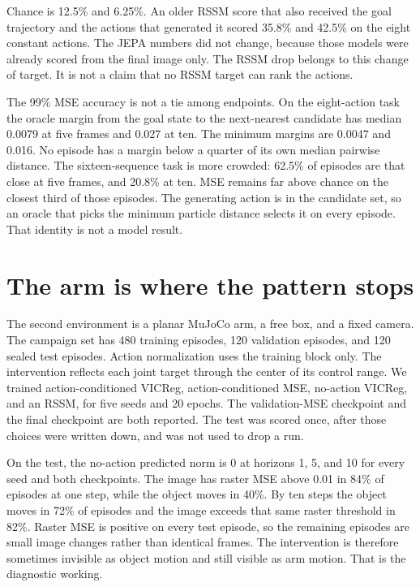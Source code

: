 \documentclass{article}
\begin{document}
Chance is 12.5\% and 6.25\%. An older RSSM score that also received the goal trajectory and the actions that generated it scored 35.8\% and 42.5\% on the eight constant actions. The JEPA numbers did not change, because those models were already scored from the final image only. The RSSM drop belongs to this change of target. It is not a claim that no RSSM target can rank the actions.

The 99\% MSE accuracy is not a tie among endpoints. On the eight-action task the oracle margin from the goal state to the next-nearest candidate has median 0.0079 at five frames and 0.027 at ten. The minimum margins are 0.0047 and 0.016. No episode has a margin below a quarter of its own median pairwise distance. The sixteen-sequence task is more crowded: 62.5\% of episodes are that close at five frames, and 20.8\% at ten. MSE remains far above chance on the closest third of those episodes. The generating action is in the candidate set, so an oracle that picks the minimum particle distance selects it on every episode. That identity is not a model result.

\section{The arm is where the pattern stops}

The second environment is a planar MuJoCo arm, a free box, and a fixed camera. The campaign set has 480 training episodes, 120 validation episodes, and 120 sealed test episodes. Action normalization uses the training block only. The intervention reflects each joint target through the center of its control range. We trained action-conditioned VICReg, action-conditioned MSE, no-action VICReg, and an RSSM, for five seeds and 20 epochs. The validation-MSE checkpoint and the final checkpoint are both reported. The test was scored once, after those choices were written down, and was not used to drop a run.

On the test, the no-action predicted norm is 0 at horizons 1, 5, and 10 for every seed and both checkpoints. The image has raster MSE above 0.01 in 84\% of episodes at one step, while the object moves in 40\%. By ten steps the object moves in 72\% of episodes and the image exceeds that same raster threshold in 82\%. Raster MSE is positive on every test episode, so the remaining episodes are small image changes rather than identical frames. The intervention is therefore sometimes invisible as object motion and still visible as arm motion. That is the diagnostic working.
\end{document}
